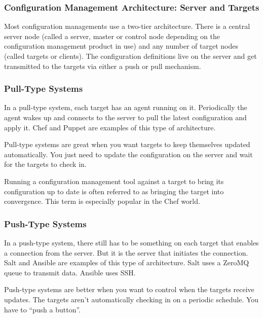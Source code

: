 \documentclass[helvetica,english,utf8,notitle,nologo]{beamer}
\begin{document}
\begin{frame}
  \frametitle{Configuration Management Architecture: Server and Targets}

  Most configuration managements use a two-tier architecture. There is
  a central server node (called a server, master or control node
  depending on the configuration management product in use) and any
  number of target nodes (called targets or clients). The
  configuration definitions live on the server and get transmitted to
  the targets via either a push or pull mechanism.
\end{frame}

\begin{frame}
  \frametitle{Pull-Type Systems}

  In a pull-type system, each target has an agent running on
  it. Periodically the agent wakes up and connects to the server to
  pull the latest configuration and apply it. Chef and Puppet are
  examples of this type of architecture.

  Pull-type systems are great when you want targets to keep themselves
  updated automatically. You just need to update the configuration on
  the server and wait for the targets to check in.

  Running a configuration management tool against a target to bring
  its configuration up to date is often referred to as bringing the
  target into convergence. This term is especially popular in the Chef
  world.
\end{frame}

\begin{frame}
  \frametitle{Push-Type Systems}
  
  In a push-type system, there still has to be something on each
  target that enables a connection from the server. But it is the
  server that initiates the connection. Salt and Ansible are examples
  of this type of architecture. Salt uses a ZeroMQ queue to
  transmit data. Ansible uses SSH.

  Push-type systems are better when you want to control when the
  targets receive updates. The targets aren't automatically checking
  in on a periodic schedule. You have to ``push a button''.
\end{frame}
\end{document}
